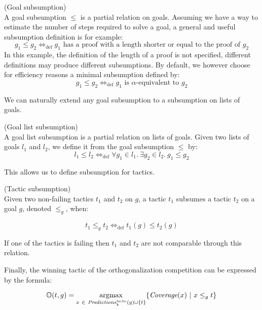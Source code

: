 \documentclass[runningheads,a4paper,draft]{svjour3}
\DeclareMathOperator*{\argmax}{\arg\!\max}
\begin{document}
\begin{definition} (Goal subsumption)\\
A goal subsumption $\le$ is a partial relation on goals.
Assuming we have a way to estimate the number of steps required to solve a goal,
a %
general and useful subsumption definition is for example:
\[g_1 \le g_2  \Leftrightarrow_{\mathrm{def}} g_1 \mbox{ has a proof with a length
shorter
or equal to the proof of }
g_2\]
In this example, the definition of the 
length of a proof is not specified, different definitions may produce different 
subsumptions.
By default, we however choose for efficiency reasons a minimal subsumption defined by:
\[g_1 \le g_2  \Leftrightarrow_{\mathrm{def}} g_1 \mbox{ is }\alpha\mbox{-equivalent
to } g_2\]
\end{definition}

We can naturally extend any goal subsumption to a subsumption on
lists of goals.
\begin{definition} (Goal list subsumption)\\
A goal list subsumption is a partial relation on lists of goals.
Given two lists of goals $l_1$ and $l_2$, we define it from the goal
subsumption $\le$ by:
\[l_1 \le l_2  \Leftrightarrow_{\mathrm{def}} \forall g_1 \in l_1.\ \exists g_2 \in l_2.\
g_1 \le g_2\]
\end{definition}

This allows us to define subsumption for tactics.
\begin{definition}\label{def:tacsub}(Tactic subsumption)\\
Given two non-failing tactics $t_1$ and $t_2$ on $g$, a tactic $t_1$ subsumes a
tactic $t_2$ on a goal $g$, denoted $\le_g$, when:

\[t_1 \le_g t_2 \Leftrightarrow_{\mathrm{def}} t_1(g) \le t_2(g)\]

If one of the tactics is failing then $t_1$ and $t_2$ are not comparable through
this relation.
\end{definition}

Finally, the winning tactic of the orthogonalization competition can be
expressed by the formula:

\[\mathbb{O}(t,g) = \argmax_{x\ \in\
\mathit{Predictions}^{\mathit{tactic}}_k(g) \cup
\lbrace t
\rbrace} \lbrace
\textit{\mbox{Coverage}}(x)\
|\ x \le_g t\rbrace\]
\end{document}
